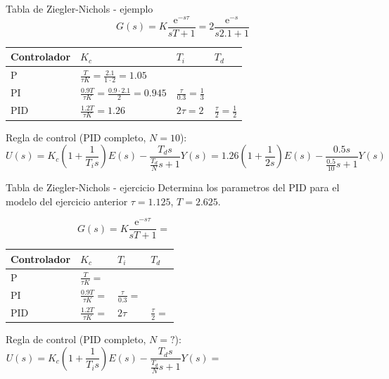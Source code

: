 \documentclass[presentation,aspectratio=1610]{beamer}
\begin{document}
\begin{frame}[label={sec:orga6d38fe}]{Tabla de  Ziegler-Nichols - ejemplo}
\[ G(s) = K \frac{\mathrm{e}^{-s\tau}}{sT + 1} = 2 \frac{\mathrm{e}^{-s}}{s2.1 + 1} \]
   \begin{center}
   \setlength{\tabcolsep}{20pt}
   \renewcommand{\arraystretch}{1.5}
   \begin{tabular}{llll}
   Controlador & \(K_c\) & \(T_i\) & \(T_d\)\\
  \hline\hline
  P & \(\frac{T}{\tau K} = \frac{2.1}{1 \cdot 2} = 1.05\) &  & \\
  PI & \(\frac{0.9T}{\tau K} = \frac{0.9\cdot 2.1}{2}= 0.945\) & \(\frac{\tau}{0.3} = \frac{1}{3} \) & \\
  PID & \(\frac{1.2T}{\tau K} = 1.26 \) & \(2\tau=2\) & \(\frac{\tau}{2}=\frac{1}{2}\)\\
  \hline
\end{tabular}
\end{center}
Regla de control (PID completo, \(N=10\)):
\[ U(s) = K_c\left( 1 + \frac{1}{T_i s} \right) E(s) - \frac{T_d s}{\frac{T_d}{N} s + 1}Y(s)
           =  1.26\left( 1 + \frac{1}{2 s} \right) E(s) - \frac{0.5s}{\frac{0.5}{10} s + 1}Y(s)\]
\end{frame}


\begin{frame}[label={sec:orgdaa3e58}]{Tabla de  Ziegler-Nichols - ejercicio}
Determina los parametros del PID para el modelo del ejercicio anterior \(\tau = 1.125\), \(T = 2.625\).

\[ G(s) = K \frac{\mathrm{e}^{-s\tau}}{sT + 1} =  \qquad\qquad\qquad\qquad\qquad\qquad \]
   \begin{center}
   \setlength{\tabcolsep}{20pt}
   \renewcommand{\arraystretch}{1.5}
   \begin{tabular}{llll}
   Controlador & \(K_c\) & \(T_i\) & \(T_d\)\\
  \hline\hline
  P & \(\frac{T}{\tau K} = \) &  & \\
  PI & \(\frac{0.9T}{\tau K} = \) & \(\frac{\tau}{0.3} = \) & \\
  PID & \(\frac{1.2T}{\tau K} = \) & \(2\tau\) & \(\frac{\tau}{2}=\)\\
  \hline
\end{tabular}
\end{center}
Regla de control (PID completo, \(N=?\)):
\[ U(s) = K_c\left( 1 + \frac{1}{T_i s} \right) E(s) - \frac{T_d s}{\frac{T_d}{N} s + 1}Y(s)
           =  \qquad\qquad\qquad\qquad\qquad\qquad\quad\quad\]
\end{frame}
\end{document}
